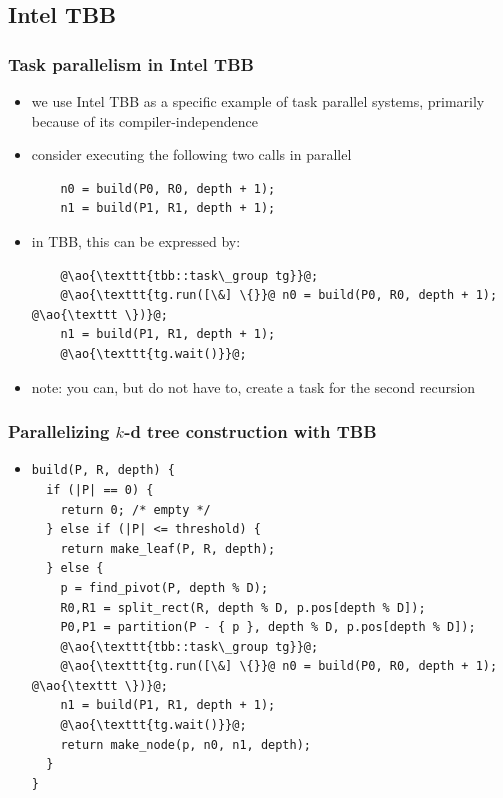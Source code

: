 \documentclass[12pt,dvipdfmx]{beamer}
\newcommand{\ao}[1]{{\color{blue}#1}}
\begin{document}
\iffalse
\subsection{Intel TBB}
\begin{frame}[fragile]
\frametitle{Task parallelism in Intel TBB}
\begin{itemize}
\item we use Intel TBB as a specific example of task parallel
  systems, primarily because of its compiler-independence
\item consider executing the following two calls in parallel
\begin{lstlisting}
    n0 = build(P0, R0, depth + 1);
    n1 = build(P1, R1, depth + 1);
\end{lstlisting}
\item in TBB, this can be expressed by:
\begin{lstlisting}
    @\ao{\texttt{tbb::task\_group tg}}@;
    @\ao{\texttt{tg.run([\&] \{}}@ n0 = build(P0, R0, depth + 1); @\ao{\texttt \})}@;
    n1 = build(P1, R1, depth + 1);
    @\ao{\texttt{tg.wait()}}@;
\end{lstlisting}

\item note: you can, but do not have to, create a task for the second recursion
\end{itemize}
\end{frame}


\begin{frame}[fragile]
\frametitle{Parallelizing $k$-d tree construction with TBB}
\begin{itemize}
\item []
\begin{lstlisting}
build(P, R, depth) {
  if (|P| == 0) {
    return 0; /* empty */
  } else if (|P| <= threshold) {
    return make_leaf(P, R, depth);
  } else {
    p = find_pivot(P, depth % D);
    R0,R1 = split_rect(R, depth % D, p.pos[depth % D]);
    P0,P1 = partition(P - { p }, depth % D, p.pos[depth % D]);
    @\ao{\texttt{tbb::task\_group tg}}@;
    @\ao{\texttt{tg.run([\&] \{}}@ n0 = build(P0, R0, depth + 1); @\ao{\texttt \})}@;
    n1 = build(P1, R1, depth + 1);
    @\ao{\texttt{tg.wait()}}@;
    return make_node(p, n0, n1, depth);
  }
}
\end{lstlisting}
\end{itemize}
\end{frame}
\end{document}
